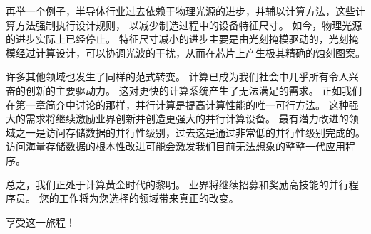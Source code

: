再举一个例子，半导体行业过去依赖于物理光源的进步，并辅以计算方法，这些计算方法强制执行设计规则，
以减少制造过程中的设备特征尺寸。 如今，物理光源的进步实际上已经停止。 
特征尺寸减小的进步主要是由光刻掩模驱动的，光刻掩模经过计算设计，可以协调光波的干扰，从而在芯片上产生极其精确的蚀刻图案。

许多其他领域也发生了同样的范式转变。 计算已成为我们社会中几乎所有令人兴奋的创新的主要驱动力。 
这对更快的计算系统产生了无法满足的需求。 正如我们在第一章简介中讨论的那样，并行计算是提高计算性能的唯一可行方法。 
这种强大的需求将继续激励业界创新并创造更强大的并行计算设备。 
最有潜力改进的领域之一是访问存储数据的并行性级别，过去这是通过非常低的并行性级别完成的。 
访问海量存储数据的根本性改进可能会激发我们目前无法想象的整整一代应用程序。

总之，我们正处于计算黄金时代的黎明。 业界将继续招募和奖励高技能的并行程序员。 
您的工作将为您选择的领域带来真正的改变。

享受这一旅程！